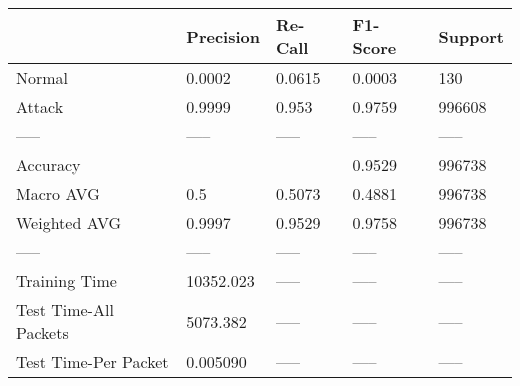 \begin{tabular}{lllll}
\toprule
{} &  Precision & Re-Call & F1-Score & Support \\
\midrule
Normal                &     0.0002 &  0.0615 &   0.0003 &     130 \\
Attack                &     0.9999 &   0.953 &   0.9759 &  996608 \\
-----                 &      ----- &   ----- &    ----- &   ----- \\
Accuracy              &            &         &   0.9529 &  996738 \\
Macro AVG             &        0.5 &  0.5073 &   0.4881 &  996738 \\
Weighted AVG          &     0.9997 &  0.9529 &   0.9758 &  996738 \\
-----                 &      ----- &   ----- &    ----- &   ----- \\
Training Time         &  10352.023 &   ----- &    ----- &   ----- \\
Test Time-All Packets &   5073.382 &   ----- &    ----- &   ----- \\
Test Time-Per Packet  &   0.005090 &   ----- &    ----- &   ----- \\
\bottomrule
\end{tabular}
